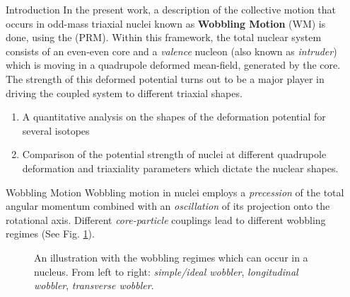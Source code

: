 \documentclass[final]{beamer}
\newlength{\sepwidth}
\newlength{\colwidth}
\newcommand{\separatorcolumn}{\begin{column}{\sepwidth}\end{column}}
\begin{document}
\begin{frame}[t]
\begin{columns}[t]
\separatorcolumn
\begin{column}{\colwidth}
  \begin{block}{Introduction}
In the present work, a description of the collective motion that occurs in odd-mass triaxial nuclei known as \textbf{Wobbling Motion} (WM) is done, using the  (PRM). Within this framework, the total nuclear system consists of an even-even core and a \emph{valence} nucleon (also known as \emph{intruder}) which is moving in a quadrupole deformed mean-field, generated by the core. The strength of this deformed potential turns out to be a major player in driving the coupled system to different triaxial shapes.
\begin{enumerate}
    \item A quantitative analysis on the shapes of the deformation potential for several isotopes
    \item Comparison of the potential strength of nuclei at different quadrupole deformation and triaxiality parameters which dictate the nuclear shapes.
\end{enumerate}
  \end{block}
\begin{block}{Wobbling Motion}
  Wobbling motion in nuclei employs a \emph{precession} of the total angular momentum combined with an \emph{oscillation} of its projection onto the rotational axis. Different \emph{core-particle} couplings lead to different wobbling regimes (See Fig. \ref{wobbling-regimes}).
  \begin{figure}
      \centering
      \caption{An illustration with the wobbling regimes which can occur in a nucleus. From left to right: \emph{simple/ideal wobbler}, \emph{longitudinal wobbler}, \emph{transverse wobbler}.}
      \label{wobbling-regimes}
  \end{figure}

\end{block}
\end{column}
\end{columns}
\end{frame}
\end{document}
